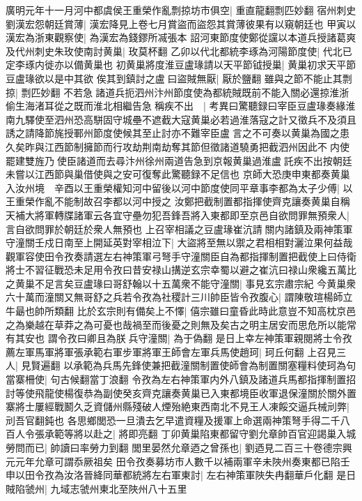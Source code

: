 廣明元年十一月河中都虞侯王重榮作亂剽掠坊市俱空|{
	重直龍翻剽匹妙翻}
宿州刺史劉漢宏怨朝廷賞薄|{
	漢宏降見上卷七月賞盜而盜怨其賞薄彼果有以窺朝廷也}
甲寅以漢宏為浙東觀察使|{
	為漢宏為錢鏐所㓕張本}
詔河東節度使鄭從讜以本道兵授諸葛爽及代州刺史朱玫使南討黄巢|{
	玫莫杯翻}
乙卯以代北都統李琢為河陽節度使|{
	代北已定李琢内徙亦以備黄巢也}
初黄巢將度淮豆盧瑑請以天平節钺授巢|{
	黄巢初求天平節豆盧瑑欲以是中其欲}
俟其到鎮討之盧曰盜賊無厭|{
	厭於鹽翻}
雖與之節不能止其剽掠|{
	剽匹妙翻}
不若急諸道兵扼泗州汴州節度使為都統賊既前不能入關必還掠淮浙偷生海渚耳從之既而淮北相繼告急稱疾不出　|{
	考異曰驚聽録曰宰臣豆盧瑑奏緣淮南九驛使至泗州恐高駢固守城壘不遮截大寇黄巢必若過淮落寇之計又徵兵不及須且誘之請降節旄授鄆州節度使候其至止討亦不難宰臣盧言之不可奏以黄巢為國之患久矣昨與江西節制擁節而行攻劫荆南劫奪其節但徵諸道驍勇把截泗州因此不内使罷建雙旌乃使臣諸道而去尋汴州徐州兩道告急到京報黄巢過淮盧託疾不出按朝廷未嘗以江西節與巢借使與之安可復奪此驚聽録不足信也}
京師大恐庚申東都奏黄巢入汝州境　辛酉以王重榮權知河中留後以河中節度使同平章事李都為太子少傅|{
	以王重榮作亂不能制故召李都以河中授之}
汝鄭把截制置都指揮使齊克讓奏黄巢自稱天補大將軍轉牒諸軍云各宜守壘勿犯吾鋒吾將入東都即至京邑自欲問罪無預衆人|{
	言自欲問罪於朝廷於衆人無預也}
上召宰相議之豆盧瑑崔沆請關内諸鎮及兩神策軍守潼關壬戍日南至上開延英對宰相泣下|{
	大盜將至無以禦之君相相對灑泣果何益哉}
觀軍容使田令孜奏請選左右神策軍弓弩手守潼關臣自為都指揮制置把截使上曰侍衛將士不習征戰恐未足用令孜曰昔安禄山搆逆玄宗幸蜀以避之崔沆曰禄山衆纔五萬比之黄巢不足言矣豆盧瑑曰哥舒翰以十五萬衆不能守潼關|{
	事見玄宗肅宗紀}
今黄巢衆六十萬而潼關又無哥舒之兵若令孜為社稷計三川帥臣皆令孜腹心|{
	謂陳敬瑄楊師立牛朂也帥所類翻}
比於玄宗則有備矣上不懌|{
	僖宗雖曰童昏此時此意豈不知高枕京邑之為樂越在草莽之為可憂也哉禍至而後憂之則無及矣古之明主居安而思危所以能常有其安也}
謂令孜曰卿且為朕兵守潼關|{
	為于偽翻}
是日上幸左神策軍親閱將士令孜薦左軍馬軍將軍張承範右軍步軍將軍王師會左軍兵馬使趙珂|{
	珂丘何翻}
上召見三人|{
	見賢遍翻}
以承範為兵馬先鋒使兼把截潼關制置使師會為制置關塞糧料使珂為句當寨柵使|{
	句古候翻當丁浪翻}
令孜為左右神策軍内外八鎮及諸道兵馬都指揮制置招討等使飛龍使楊復恭為副使癸亥齊克讓奏黄巢已入東都境臣收軍退保潼關於關外置寨將士屢經戰鬭久乏資儲州縣殘破人煙殆絶東西南北不見王人凍餒交逼兵械刓弊|{
	刓吾官翻鈍也}
各思鄉閭恐一旦潰去乞早遣資糧及援軍上命選兩神策弩手得二千八百人令張承範等將以赴之|{
	將即亮翻}
丁卯黄巢陷東都留守劉允章帥百官迎謁巢入城勞問而已|{
	帥讀曰率勞力到翻}
閭里晏然允章迺之曾孫也|{
	劉迺見二百三十卷德宗興元元年允章可謂忝厥祖矣}
田令孜奏募坊市人數千以補兩軍辛未陜州奏東都已陷壬申以田令孜為汝洛晉絳同華都統將左右軍東討|{
	左右神策軍陜失冉翻華戶化翻}
是日賊陷虢州|{
	九域志虢州東北至陜州八十五里}
